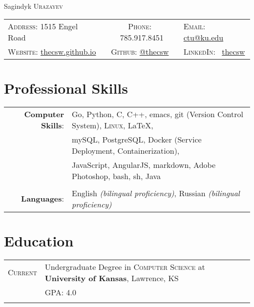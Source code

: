 \documentclass[letterpaper,10pt]{article}
\begin{document}
\pagestyle{empty} %

\par{\centering
		{\Huge Sagindyk \textsc{Urazayev}
	}\smallskip\par}

      \begin{center}
        \begin{tabular}{lcl}
          \textsc{Address:}   1515 Engel Road &
          \textsc{Phone:} \quad \ 785.917.8451 &
          \textsc{Email:} \quad \href{mailto:ctu@ku.edu}{ctu@ku.edu} \\

          \textsc{Website:} \href{https://thecsw.github.io}{thecsw.github.io}&
          \textsc{Github:} \quad \href{https://github.com/thecsw}{@thecsw}&
          \textsc{LinkedIn:} \ \href{https://linkedin.com/in/thecsw}{thecsw}\\
        \end{tabular}
      \end{center}
      
\section{Professional Skills}
\begin{tabular}{rl}

  \textbf{Computer Skills}:& Go, Python, C, C++, emacs, git (Version Control System), \textsc{Linux}, \LaTeX, \\& mySQL,
  PostgreSQL, Docker (Service Deployment, Containerization),\\&
  JavaScript, AngularJS, markdown, Adobe Photoshop, bash, sh, Java\\\\

  \textbf{Languages}: &English \emph{(bilingual proficiency)}, Russian \emph{(bilingual proficiency)}\\
  
\end{tabular}

\section{Education}
\begin{tabular}{rl}

  \textsc{Current} & Undergraduate Degree in \textsc{Computer Science} at \normalsize\textbf{University of Kansas}, Lawrence, KS\\
  &\textsc{GPA}: 4.0\\
  \\
  
\end{tabular}
\end{document}
